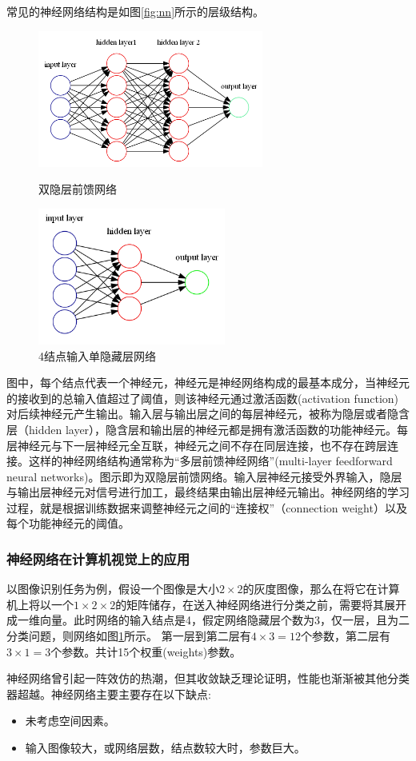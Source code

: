 \documentclass[12pt,a4paper,titlepage]{article}
\begin{document}
常见的神经网络结构是如图\ref{fig:nn}所示的层级结构。
\begin{figure}[htbp]
\begin{minipage}[t]{0.35\linewidth}
\centering
\includegraphics[height=4.5cm]{img/neural_network.png}
\caption{双隐层前馈网络}
\label{fig:nn}
\end{minipage}%
\hfill
\begin{minipage}[t]{0.5\linewidth}
\centering
\includegraphics[height=4.5cm]{img/nn431.png}
\caption{4结点输入单隐藏层网络}
\label{fig:sample}
\end{minipage}
\end{figure}
图中，每个结点代表一个神经元，神经元是神经网络构成的最基本成分，当神经元的接收到的总输入值超过了阈值，则该神经元通过激活函数(activation function)对后续神经元产生输出。输入层与输出层之间的每层神经元，被称为隐层或者隐含层（hidden layer），隐含层和输出层的神经元都是拥有激活函数的功能神经元。每层神经元与下一层神经元全互联，神经元之间不存在同层连接，也不存在跨层连接。这样的神经网络结构通常称为“多层前馈神经网络”(multi-layer feedforward neural networks)。图示即为双隐层前馈网络。输入层神经元接受外界输入，隐层与输出层神经元对信号进行加工，最终结果由输出层神经元输出。神经网络的学习过程，就是根据训练数据来调整神经元之间的“连接权”（connection weight）以及每个功能神经元的阈值。\par
\subsubsection*{神经网络在计算机视觉上的应用}
以图像识别任务为例，假设一个图像是大小$2 \times 2$的灰度图像，那么在将它在计算机上将以一个$1 \times 2 \times 2$的矩阵储存，在送入神经网络进行分类之前，需要将其展开成一维向量。此时网络的输入结点是4，假定网络隐藏层个数为3，仅一层，且为二分类问题，则网络如图\ref{fig:sample}所示。
第一层到第二层有$4 \times 3 = 12$个参数，第二层有$3\times 1 = 3 $个参数。共计15个权重(weights)参数。\par
神经网络曾引起一阵效仿的热潮，但其收敛缺乏理论证明，性能也渐渐被其他分类器超越。神经网络主要主要存在以下缺点:
\begin{itemize}

   \item 未考虑空间因素。
   \item 输入图像较大，或网络层数，结点数较大时，参数巨大。
\end{itemize}
\end{document}
